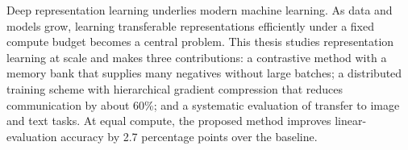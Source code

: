 Deep representation learning underlies modern machine learning. As data and models grow, learning
transferable representations efficiently under a fixed compute budget becomes a central problem.
This thesis studies representation learning at scale and makes three contributions: a contrastive
method with a memory bank that supplies many negatives without large batches; a distributed
training scheme with hierarchical gradient compression that reduces communication by about 60\%;
and a systematic evaluation of transfer to image and text tasks. At equal compute, the proposed
method improves linear-evaluation accuracy by 2.7 percentage points over the baseline.
